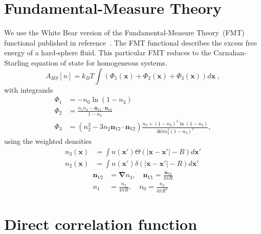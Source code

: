 \documentclass[letterpaper,twocolumn,amsmath,amssymb,prb]{revtex4-1}
\newcommand{\xx}{\textbf{x}}
\begin{document}
\section{Fundamental-Measure Theory}

We use the White Bear version of the Fundamental-Measure Theory~(FMT)
functional published in reference~\cite{roth2002whitebear}.  The FMT
functional describes the excess free energy of a hard-sphere fluid.
This particular FMT reduces to the Carnahan-Starling equation of state
for homogeneous systems.
\begin{equation}
A_\textit{HS}[n] = k_B T \int \left(\Phi_1(\xx) + \Phi_2(\xx) + \Phi_3(\xx)\right) d\xx \; ,
\end{equation}
with integrands
\begin{align}
\Phi_1 &= -n_0 \ln\left( 1 - n_3\right)\\
\Phi_2 &= \frac{n_1 n_2 - \mathbf{n}_{V1} \cdot\mathbf{n}_{V2}}{1-n_3} \\
\Phi_3 &= (n_2^3 - 3 n_2 \mathbf{n}_{V2} \cdot \mathbf{n}_{V2}) \frac{
  n_3 + (1-n_3)^2 \ln(1-n_3)
}{
  36\pi n_3^2\left( 1 - n_3 \right)^2
} ,
\end{align}
using the weighted densities
\begin{align}
  n_3(\xx) &= \int n(\xx') \Theta(\left|\xx - \xx'\right| - R) d\xx' \\
  n_2(\xx) &= \int n(\xx') \delta(\left|\xx - \xx'\right| - R) d\xx'
\end{align}
\begin{align}
  \mathbf{n}_{V2} &= \mathbf{\nabla} n_3 , \quad
  \mathbf{n}_{V1} = \frac{\mathbf{n}_{V2}}{4\pi R} \\
  n_1 &= \frac{n_2}{4\pi R} , \quad
  n_0 = \frac{n_2}{4\pi R^2}
\end{align}

\section{Direct correlation function}
\end{document}
